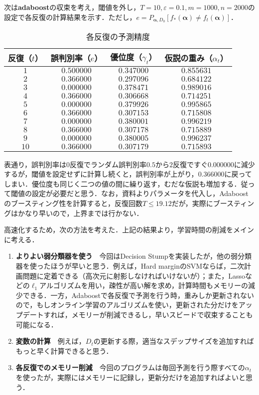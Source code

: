 \documentclass[a4paper,11pt]{jsarticle}
\numberwithin{theorem}{section}  %
\numberwithin{equation}{section} %
\begin{document}
次は{\bf adaboost}の収束を考え，閾値を外し，$T=10,\varepsilon=0.1,m=1000,n=2000$の設定で各反復の計算結果を示す．ただし，$e=P_{\bm{\alpha},D_0} [f_*(\bm{\alpha})\neq f_t(\bm{\alpha})]$．

\begin{table}[htdp]
\caption{各反復の予測精度}
\begin{center}
\begin{tabular}{|c|c|c|c|}
\hline
反復（$t$） & 誤判別率（$e$） & 優位度（$\gamma_t$）& 仮説の重み（$\alpha_t$）\\
\hline
$1$ & $0.500000$ & $0.347000$ & $0.855631$\\
$2$ & $0.366000$ & $0.297096$ & $0.684122$\\
$3$ & $0.000000$ & $0.378471$ & $0.989016$\\
$4$ & $0.366000$ & $0.306668$ & $0.714251$\\
$5$ & $0.000000$ & $0.379926$ & $0.995865$\\
$6$ & $0.366000$ & $0.307153$ & $0.715808$\\
$7$ & $0.000000$ & $0.380001$ & $0.996219$\\
$8$ & $0.366000$ & $0.307178$ & $0.715889$\\
$9$ & $0.000000$ & $0.380005$ & $0.996237$\\
$10$ & $0.366000$ & $0.307179$ & $0.715893$\\
\hline
\end{tabular}
\end{center}
\label{default}
\end{table}
表通り，誤判別率は$0$反復でランダム誤判別率$0.5$から$2$反復ですぐ$0.000000$に減少するが，閾値を設定せずに計算し続くと，誤判別率が上がり，$0.366000$に戻ってしまい．優位度も同じく二つの値の間に繰り返す，むだな仮説も増加する．従って閾値の設定が必要だと思う．なお，資料よりパラメータを代入し，Adaboostのブースティング性を計算すると，反復回数$T\le 19.12$だが，実際にブースティングはかなり早いので，上界までは行かない．

高速化するため，次の方法を考えた．上記の結果より，学習時間の削減をメインに考える．
\begin{enumerate}
\item {\bf よりよい弱分類器を使う}\,\,\,\,
今回はDecision Stumpを実装したが，他の弱分類器を使ったほうが早いと思う．例えば，Hard marginのSVMならば，二次計画問題に定着できる（高次元に射影しなければいけないが）；また，Lassoなどの$\ell_1$アルゴリズムを用い，疎性が高い解を求め，計算時間もメモリーの減少できる．一方，Adaboostで各反復で予測を行う時，重みしか更新されないので，もしオンライン学習のアルゴリズムを使い，更新された分だけをアップデートすれば，メモリーが削減できるし，早いスビードで収束することも可能になる．
\item {\bf 変数の計算}\,\,\,\, 例えば，$D_t$の更新する際，適当な$スデップサイズ$を追加すればもっと早く計算できると思う．
\item {\bf 各反復でのメモリー削減}\,\,\,\,
今回のプログラムは毎回予測を行う際すべての$\alpha_t$を使ったが，実際にはメモリーに記録し，更新分だけを追加すればよいと思う．


\end{enumerate}
\end{document}
